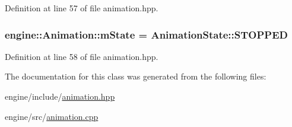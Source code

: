 Definition at line 57 of file animation.\+hpp.

\subsubsection[{\texorpdfstring{m\+State}{mState}}]{ engine\+::\+Animation\+::m\+State = {\bf Animation\+State\+::\+S\+T\+O\+P\+P\+ED}}\hypertarget{classengine_1_1_animation_afa99aa470cb938b88ae337079d5628b7}{}\label{classengine_1_1_animation_afa99aa470cb938b88ae337079d5628b7}


Definition at line 58 of file animation.\+hpp.



The documentation for this class was generated from the following files\+:\begin{DoxyCompactItemize}
\item 
engine/include/\hyperlink{animation_8hpp}{animation.\+hpp}\item 
engine/src/\hyperlink{animation_8cpp}{animation.\+cpp}\end{DoxyCompactItemize}
